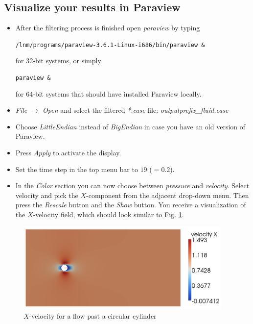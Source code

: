 \subsection{Visualize your results in Paraview}
\begin{itemize}
\item After the filtering process is finished open \emph{paraview} by typing
\begin{center}
  \texttt{/lnm/programs/paraview-3.6.1-Linux-i686/bin/paraview \&}
\end{center}
for 32-bit systems, or simply
\begin{center}
  \texttt{paraview \&}
\end{center}
for 64-bit systems that should have installed Paraview locally.

\item \emph{File $\to$ Open} and select the filtered \emph{*.case} file: \emph{outputprefix\_fluid.case}

\item Choose \emph{LittleEndian} instead of \emph{BigEndian} in case you have an old version of Paraview.

\item Press \emph{Apply} to activate the display.

\item Set the time step in the top menu bar to $19$ ($=0.2$).

\item In the \emph{Color} section you can now choose between \emph{pressure} and \emph{velocity}. Select velocity and pick the $X$-component from the adjacent drop-down menu. Then press the \emph{Rescale} button and the \emph{Show} button. You receive a visualization of the $X$-velocity field, which should look similar to Fig. \ref{fig:FlowPastCylinder_x-velocity}.
\end{itemize}

\begin{figure}[H]
 \begin{center}
  \includegraphics[width=0.95\textwidth]{pics/tut_fluid_xvel.png}   
  \caption{$X$-velocity for a flow past a circular cylinder}
  \label{fig:FlowPastCylinder_x-velocity}
\end{center}
\end{figure}